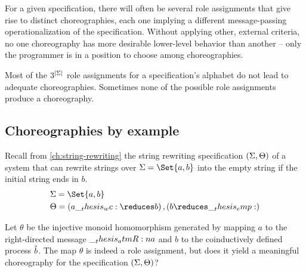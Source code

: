 For a given specification, there will often be several role assignments that give rise to distinct choreographies, each one implying a different message-passing operationalization of the specification.
Without applying other, external criteria, no one choreography has more desirable lower-level behavior than another -- only the programmer is in a position to choose among choreographies.

Most of the $3^{\lvert\Sigma\rvert}$ role assignments for a specification's alphabet do not lead to adequate choreographies.
Sometimes none of the possible role assignments produce a choreography.

\subsection{Choreographies by example}


Recall from \cref{ch:string-rewriting} the string rewriting specification $(\Sigma, \Theta)$ of a system that can rewrite strings over $\sralph = \Set{a,b}$ into the empty string if the initial string ends in $b$.
\begin{equation*}
  \begin{lgathered}
    \sralph = \Set{a,b} \\
    \srsig = (a \wc \reduces b) \,, (b \reduces \emp)
  \end{lgathered}
\end{equation*}

Let $\theta$ be the injective monoid homomorphism generated by mapping $a$ to the right-directed message $\__thesis_atmR:n {a}$ and $b$ to the coinductively defined process $\hat{b}$.%
The map $\theta$ is indeed a role assignment, but does it yield a meaningful choreography for the specification $(\Sigma, \Theta)$?

